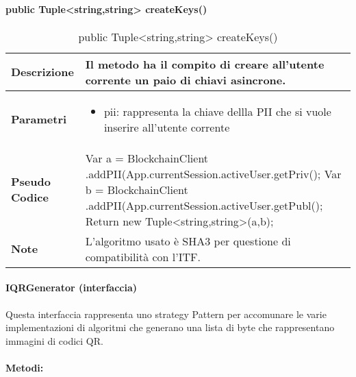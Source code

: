\paragraph{public Tuple<string,string> createKeys()}
\begin{center}
    \begin{longtable}{|p{3cm}|p{9cm}|}%
    \caption{public Tuple<string,string> createKeys()}
    \endfirsthead
    \endhead
    \hline
    \textbf{Descrizione} & Il metodo ha il compito di creare all’utente corrente un paio di chiavi asincrone.\\
    \hline
    \textbf{Parametri} &      
    \begin{itemize}
        \item pii: rappresenta la chiave dellla PII che si vuole inserire all’utente corrente
    \end{itemize}
    \\
    \hline
    \textbf{Pseudo Codice} & 
    Var a = BlockchainClient \newline
    .addPII(App.currentSession.activeUser.getPriv(); \newline
    Var b = BlockchainClient \newline
    .addPII(App.currentSession.activeUser.getPubl(); \newline
    Return new Tuple<string,string>(a,b); \newline
    \\
    \hline
    \textbf{Note} & 
    L’algoritmo usato è SHA3 per questione di compatibilità con l'ITF.
    \\
    \hline
    \end{longtable}
\end{center}

\paragraph{IQRGenerator (interfaccia)}
Questa interfaccia rappresenta uno strategy Pattern per accomunare le varie implementazioni di algoritmi che generano una lista di byte che rappresentano immagini di codici QR.
\paragraph{Metodi:}

